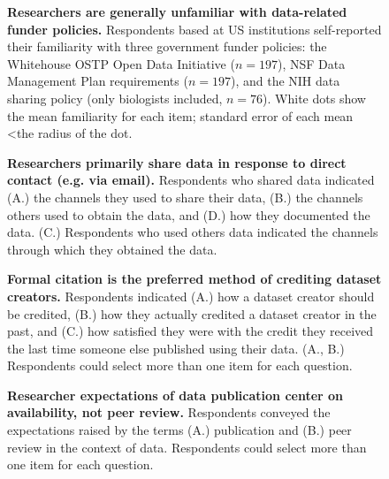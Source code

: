 \documentclass[10pt]{article}
\begin{document}
\begin{figure}[!ht]
\begin{center}
\end{center}
\caption{
{\bf Researchers are generally unfamiliar with data-related funder policies.}
Respondents based at US institutions self-reported their familiarity with three government funder policies: the Whitehouse OSTP Open Data Initiative ($n=197$), NSF Data Management Plan requirements ($n=197$), and the NIH data sharing policy (only biologists included, $n=76$). 
White dots show the mean familiarity for each item; standard error of each mean \textless the radius of the dot.
}
\label{fig:policy_knowledge}
\end{figure}


\begin{figure}[!ht]
\begin{center}
\end{center}
\caption{
{\bf Researchers primarily share data in response to direct contact (e.g. via email).}
Respondents who shared data indicated (A.) the channels they used to share their data, (B.) the channels others used to obtain the data, and (D.) how they documented the data.
(C.) Respondents who used others data indicated the channels through which they obtained the data.
}
\label{fig:sharing}
\end{figure}


\begin{figure}[!ht]
\begin{center}
\end{center}
\caption{
{\bf Formal citation is the preferred method of crediting dataset creators.}
Respondents indicated (A.) how a dataset creator should be credited, (B.) how they actually credited a dataset creator in the past, and (C.) how satisfied they were with the credit they received the last time someone else published using their data.  (A., B.) Respondents could select more than one item for each question.
} 
\label{fig:credit}
\end{figure}


\begin{figure}[!ht]
\begin{center}
\end{center}
\caption{
{\bf Researcher expectations of data publication center on availability, not peer review.}
Respondents conveyed the expectations raised by the terms (A.) publication and (B.) peer review in the context of data. Respondents could select more than one item for each question.
}
\label{fig:definitions}
\end{figure}
\end{document}
